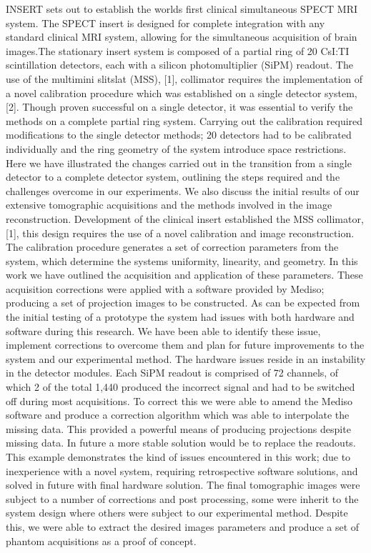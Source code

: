 INSERT sets out to establish the worlds first clinical simultaneous
SPECT MRI system. The SPECT insert is
designed for complete integration with any standard clinical
MRI system, allowing for the simultaneous acquisition of brain
images.The stationary insert system is composed of a partial
ring of 20 CsI:TI scintillation detectors, each with a silicon
photomultiplier (SiPM) readout. The use of the multimini slitslat
(MSS), [1], collimator requires the implementation of a
novel calibration procedure which was established on a single
detector system, [2]. Though proven successful on a single
detector, it was essential to verify the methods on a complete
partial ring system. Carrying out the calibration required
modifications to the single detector methods; 20 detectors had
to be calibrated individually and the ring geometry of the
system introduce space restrictions. Here we have illustrated
the changes carried out in the transition from a single detector to a complete detector system, outlining the steps required and
the challenges overcome in our experiments. We also discuss
the initial results of our extensive tomographic acquisitions
and the methods involved in the image reconstruction.
Development of the clinical insert established the MSS collimator,
[1], this design requires the use of a novel calibration
and image reconstruction. The calibration procedure generates
a set of correction parameters from the system, which determine
the systems uniformity, linearity, and geometry. In this
work we have outlined the acquisition and application of these
parameters. These acquisition corrections were applied with a
software provided by Mediso; producing a set of projection
images to be constructed.
As can be expected from the initial testing of a prototype
the system had issues with both hardware and software during
this research. We have been able to identify these issue,
implement corrections to overcome them and plan for future
improvements to the system and our experimental method. The
hardware issues reside in an instability in the detector modules.
Each SiPM readout is comprised of 72 channels, of which 2
of the total 1,440 produced the incorrect signal and had to be
switched off during most acquisitions. To correct this we were
able to amend the Mediso software and produce a correction
algorithm which was able to interpolate the missing data. This
provided a powerful means of producing projections despite
missing data. In future a more stable solution would be to
replace the readouts. This example demonstrates the kind of
issues encountered in this work; due to inexperience with a
novel system, requiring retrospective software solutions, and
solved in future with final hardware solution.
The final tomographic images were subject to a number
of corrections and post processing, some were inherit to the
system design where others were subject to our experimental
method. Despite this, we were able to extract the desired
images parameters and produce a set of phantom acquisitions
as a proof of concept.

